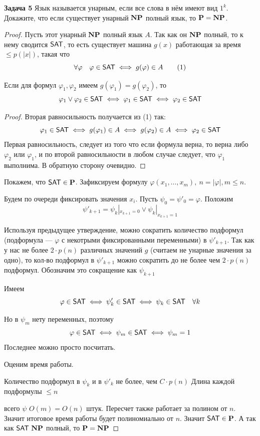 \textbf{Задача 5}  Язык называется унарным, если все слова в нём имеют вид $1^k$. Докажите, что если существует унарный $\textbf{NP}$ полный язык, то $\textbf{P}=\textbf{NP}$.

\begin{proof} 
Пусть этот унарный $\textbf{NP}$ полный язык $A$.
Так как он $\textbf{NP}$ полный, то к нему сводится $\mathsf{SAT}$, то есть существует машина $g(x)$ работающая за время $\le p(|x|)$, такая что
\[\forall \varphi\quad \varphi\in\mathsf{SAT} \iff g(\varphi)\in A \tag{1}\]

\begin{statement}   Если для формул $\varphi_1, \varphi_2$ имеем $g(\varphi_1)= g(\varphi_2)$, то 
\[\varphi_1 \vee \varphi_2 \in \mathsf{SAT} \iff \varphi_1 \in \mathsf{SAT} \iff \varphi_2 \in \mathsf{SAT}\]
\end{statement}
\begin{proof}
    Вторая равносильность получается из (1) так:
    \[\varphi_1\in\mathsf{SAT} \iff g(\varphi_1)\in A \iff g(\varphi_2)\in A \iff \varphi_2\in\mathsf{SAT} \]
    Первая равносильность, следует из того что если формула верна, то верна либо $\varphi_2$ или $\varphi_1$, и по второй равносильности в любом случае следует, что $\varphi_1$ выполнима. В обратную сторону очевидно.
\end{proof}

Покажем, что $\mathsf{SAT}\in\textbf{P}$. Зафиксируем формулу $\varphi(x_1,\ldots, x_m),\ n=|\varphi|, m \le n$.

Будем по очереди фиксировать значения $x_i$. Пусть $\psi_0=\psi'_0=\varphi$. Положим 
\[\psi'_{k+1} = \psi_k|_{x_{k+1}=0} \vee \psi_k|_{x_{k+1}=1}\]

Используя предыдущее утверждение, можно сократить количество подформул  (подформула --- $\varphi$ с некотрыми фиксированными переменными) в $\psi'_{k + 1}$. Так как у нас не более $2 \cdot p(n)$ различных значений $g$ (считаем не унарные значения за одно), то кол-во подформул в $\psi'_{k + 1}$ можно сократить до не более чем $2 \cdot p(n)$ подформул. Обозначим это сокращение как $\psi_{k+1}$

Имеем 
\[\varphi\in\mathsf{SAT}\iff\psi'_k\in\mathsf{SAT}\iff\psi_k\in\mathsf{SAT} \quad \forall k\]

Но в $\psi_m$ нету переменных, поэтому \[\varphi\in\mathsf{SAT}\iff\psi_m\in\mathsf{SAT}\iff\psi_m=1\]
Последнее можно просто посчитать.

Оценим время работы.

Количество подформул в $\psi_k$ и в $\psi'_k$ не более, чем $C\cdot p(n)$
Длина каждой подформулы $\le n$

всего $\psi$ $O(m)=O(n)$ штук. Пересчет также работает за полином от $n$. Значит итоговое время работы будет полиномиально от $n$. Значит $\mathsf{SAT}\in\textbf{P}$. 
А так как $\mathsf{SAT}\ \textbf{NP}$ полный, то $\textbf{P}=\textbf{NP}$ 
\end{proof}